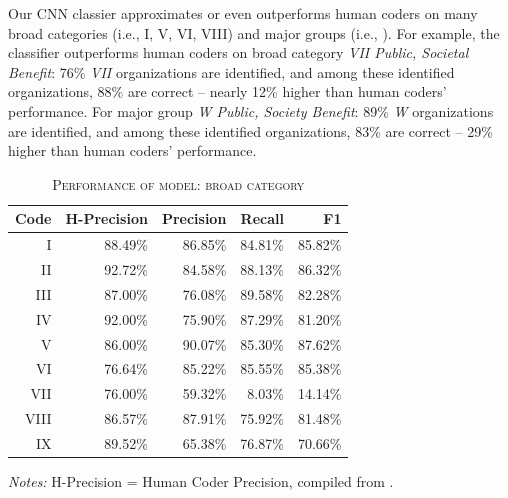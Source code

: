\documentclass[11pt]{article}
\begin{document}
Our CNN classier approximates or even outperforms human coders on many broad categories (i.e., I, V, VI, VIII) and major groups (i.e., ). For example, the classifier outperforms human coders on broad category \textit{VII Public, Societal Benefit}: 76\% \textit{VII} organizations are identified, and among these identified organizations, 88\% are correct -- nearly 12\% higher than human coders' performance. For major group \textit{W Public, Society Benefit}: 89\% \textit{W} organizations are identified, and among these identified organizations, 83\% are correct -- 29\% higher than human coders' performance.

\begin{table}
\centering
\begin{threeparttable}
    \caption{\textsc{Performance of model: broad category}} \label{tab:perf_bc}
    \begin{tabular}{r|r|r|r|r}
		\hline
			Code & H-Precision & Precision & Recall & F1 \\
		\hline
			I & 88.49\% & 86.85\% & 84.81\% & 85.82\% \\
			II & 92.72\% & 84.58\% & 88.13\% & 86.32\% \\
			III & 87.00\% & 76.08\% & 89.58\% & 82.28\% \\
			IV & 92.00\% & 75.90\% & 87.29\% & 81.20\% \\
			V & 86.00\% & 90.07\% & 85.30\% & 87.62\% \\
			VI & 76.64\% & 85.22\% & 85.55\% & 85.38\% \\
			VII & 76.00\% & 59.32\% & 8.03\% & 14.14\% \\
			VIII & 86.57\% & 87.91\% & 75.92\% & 81.48\% \\
			IX & 89.52\% & 65.38\% & 76.87\% & 70.66\% \\
    	 \hline
    \end{tabular}
\begin{tablenotes}
\footnotesize
\item \emph{Notes:} H-Precision = Human Coder Precision, compiled from \textcite[153]{StengelGettingItRight1998}.
\end{tablenotes}
\end{threeparttable}
\end{table}
\end{document}
